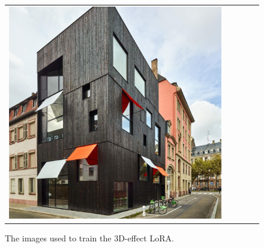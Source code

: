 \begin{figure}[H]
{\begin{tabular}{@{}ccccc@{}}
      \includegraphics[width=\linewidth]{Images/LoRAs/3D-effect/Training_images/15.jpg} \\
    \end{tabular}%
  }
  \caption{The images used to train the 3D-effect LoRA.}
  \label{fig:grid3D-effect}
\end{figure}

